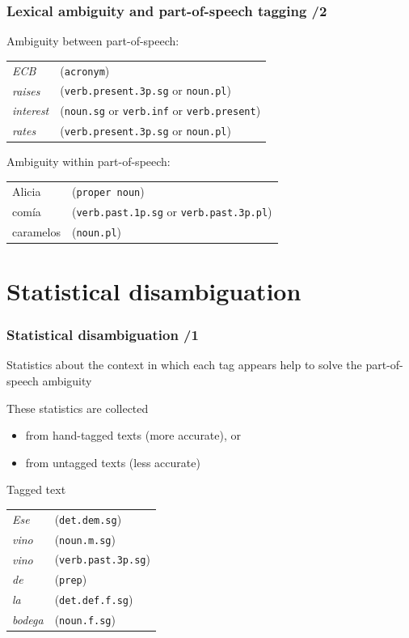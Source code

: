 \documentclass{beamer} %
\begin{document}
\begin{frame}
  \frametitle{Lexical ambiguity and part-of-speech tagging /2}

  \begin{exampleblock}{Ambiguity between part-of-speech:}
    \begin{tabular}{ll}
      \emph{ECB} & (\texttt{acronym})\\
      \emph{raises} & (\texttt{verb.present.3p.sg} or
      \texttt{noun.pl})\\
      \emph{interest} & (\texttt{noun.sg} or \texttt{verb.inf}
      or \texttt{verb.present})\\
      \emph{rates} & (\texttt{verb.present.3p.sg} or
      \texttt{noun.pl})
    \end{tabular}
  \end{exampleblock}

  \begin{exampleblock}{Ambiguity within part-of-speech:}
    \begin{tabular}{ll}
      Alicia & (\texttt{proper noun})\\
      comía & (\texttt{verb.past.1p.sg} or \texttt{verb.past.3p.pl})\\
      caramelos & (\texttt{noun.pl})\\
    \end{tabular}
  \end{exampleblock}
\end{frame}

\section{Statistical disambiguation}

\begin{frame}
  \frametitle{Statistical disambiguation /1}

  \begin{block}{}
    Statistics about the context in which each tag appears help to
    solve the part-of-speech ambiguity
  \end{block}

  These statistics are collected
  \begin{itemize}
  \item from hand-tagged texts (more accurate), or
  \item from untagged texts (less accurate)
  \end{itemize}

  \begin{exampleblock}{Tagged text}
    \begin{tabular}{ll}
      \emph{Ese} & (\texttt{det.dem.sg}) \\
      \emph{vino} & (\texttt{noun.m.sg}) \\
      \emph{vino} & (\texttt{verb.past.3p.sg}) \\
      \emph{de} & (\texttt{prep}) \\
      \emph{la} & (\texttt{det.def.f.sg}) \\
      \emph{bodega} & (\texttt{noun.f.sg}) \\
    \end{tabular}
  \end{exampleblock}
\end{frame}
\end{document}
